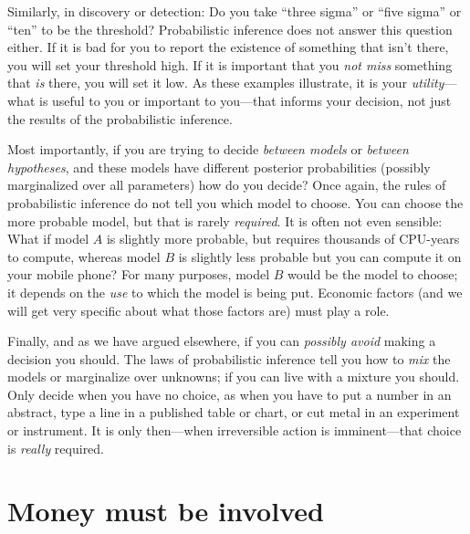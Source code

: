 \documentclass[12pt,twoside,pdftex]{article}
\begin{document}
Similarly, in discovery or detection: Do you take ``three sigma'' or
``five sigma'' or ``ten'' to be the threshold?  Probabilistic
inference does not answer this question either.  If it is bad for you
to report the existence of something that isn't there, you will set
your threshold high.  If it is important that you \emph{not miss}
something that \emph{is} there, you will set it low.  As these
examples illustrate, it is your \emph{utility}---what is useful to you
or important to you---that informs your decision, not just the results
of the probabilistic inference.

Most importantly, if you are trying to decide \emph{between models} or
\emph{between hypotheses}, and these models have different posterior
probabilities (possibly marginalized over all parameters) how do you
decide?  Once again, the rules of probabilistic inference do not tell
you which model to choose.  You can choose the
more probable model, but that is rarely \emph{required}.  It is often
not even sensible: What if model $A$ is slightly more probable, but
requires thousands of CPU-years to compute, whereas model $B$ is
slightly less probable but you can compute it on your mobile phone?
For many purposes, model $B$ would be the model to choose; it depends
on the \emph{use} to which the model is being put.  Economic factors
(and we will get very specific about what those factors are) must play
a role.

Finally, and as we have argued elsewhere, if you can
\emph{possibly avoid} making a decision you should.  The laws of
probabilistic inference tell you how to \emph{mix} the models or
marginalize over unknowns; if you can live with a mixture you should.
Only decide when you have no choice, as when you have to put a number
in an abstract, type a line in a published table or chart, or cut
metal in an experiment or instrument.  It is only then---when
irreversible action is imminent---that choice is \emph{really}
required.

\section{Money must be involved}
\end{document}
